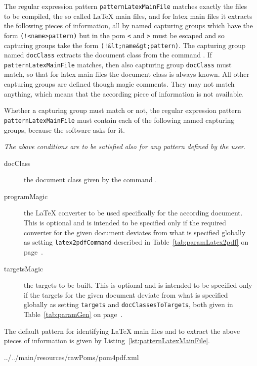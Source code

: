 The regular expression pattern \texttt{patternLatexMainFile} 
matches exactly the files to be compiled, 
the so called \LaTeX{} main files, and for latex main files 
it extracts the following pieces of information, 
all by named capturing groups which have the form \texttt{(!<name>pattern)} 
but in the pom \texttt{<} and \texttt{>} must be escaped 
and so capturing groups take the form \texttt{(!\&lt;name\&gt;pattern)}. 
The capturing group named \texttt{docClass} extracts the document class 
from the command . 
If \texttt{patternLatexMainFile} matches, 
then also capturing group \texttt{docClass} must match, 
so that for latex main files the document class is always known. 
All other capturing groups are defined though magic comments. 
They may not match anything, 
which means that the according piece of information is not available. 

Whether a capturing group must match or not, 
the regular expression pattern \texttt{patternLatexMainFile} 
must contain each of the following named capturing groups, 
because the software asks for it. 

\emph{The above conditions are to be satisfied also for any pattern defined by the user. }

\begin{description}
  \item[docClass] the document class given by the command . 
  \item[programMagic] the \LaTeX{} converter to be used 
  specifically for the according document. 
  This is optional and is intended to be specified only 
  if the required converter for the given document deviates 
  from what is specified 
  globally as setting \texttt{latex2pdfCommand} described in 
  Table~\ref{tab:paramLatex2pdf} on page~\pageref{tab:paramLatex2pdf}. 
  \item[targetsMagic] the targets to be built. 
  This is optional and is intended to be specified only 
  if the targets for the given document deviate from what is specified 
  globally as setting \texttt{targets} and \texttt{docClassesToTargets}, 
  both given in 
  Table~\ref{tab:paramGen} on page~\pageref{tab:paramGen}. 
\end{description}

The default pattern for identifying \LaTeX{} main files 
and to extract the above pieces of information 
is given by Listing~\ref{lst:patternLatexMainFile}. 



{../../main/resources/rawPoms/pom4pdf.xml}%

